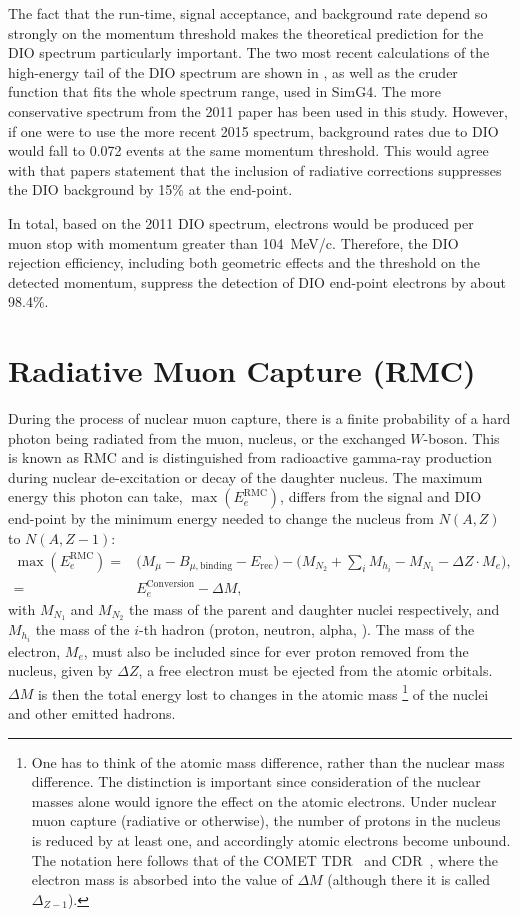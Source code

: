 \FigDIOEndPointComparison
The fact that the run-time, signal acceptance, and background rate depend so strongly on the momentum threshold makes the theoretical prediction for the \ac{DIO} spectrum particularly important.
The two most recent calculations of the high-energy tail of the DIO spectrum are shown in , as well as the cruder function that fits the whole spectrum range, used in SimG4.
The more conservative spectrum from the 2011 paper has been used in this study.
However, if one were to use the more recent 2015 spectrum, background rates due to DIO would fall to 0.072 events at the same momentum threshold.
This would agree with that papers statement that the inclusion of radiative corrections suppresses the DIO background by 15\% at the end-point.

In total, based on the 2011 DIO spectrum,  electrons would be produced per muon stop with momentum greater than 104~MeV/c.
Therefore, the DIO rejection efficiency, including both geometric effects and the threshold on the detected momentum, suppress the detection of DIO end-point electrons by about 98.4\%.

\section{Radiative Muon Capture (\acs{RMC})}
\TabRMCEndPoints%
During the process of nuclear muon capture, there is a finite probability of a hard photon being radiated from the muon, nucleus, or the exchanged $W$-boson.
This is known as \acf{RMC} and is distinguished from radioactive gamma-ray production during nuclear de-excitation or decay of the daughter nucleus.
The maximum energy this photon can take, $\max(E_e^\textrm{RMC})$, differs from the \mueconv signal and \ac{DIO} end-point by the minimum energy needed to change the nucleus from $N(A,Z)$ to $N(A,Z-1)$:
\begin{align}
\max(E_e^\textrm{RMC})=&\big(M_\mu - B_{\mu,\textrm{binding}} - E_\textrm{rec}\big)-\big(M_{N_2}+\sum_iM_{h_i}-M_{N_1}-\Delta{}Z\cdot{}M_e\big),\\
                      =&E^\textrm{Conversion}_e  - \Delta{}M,
\end{align}
with $M_{N_1}$ and $M_{N_2}$ the mass of the parent and daughter nuclei respectively, and $M_{h_i}$ the mass of the $i$-th hadron (proton, neutron, alpha, \etc).
The mass of the electron, $M_e$, must also be included since for ever proton removed from the nucleus, given by $\Delta{}Z$, a free electron must be ejected from the atomic orbitals.
$\Delta{}M$ is then the total energy lost to changes in the atomic mass%
\footnote{
One has to think of the atomic mass difference, rather than the nuclear mass difference.
The distinction is important since consideration of the nuclear masses alone would ignore the effect on the atomic electrons.
Under nuclear muon capture (radiative or otherwise), the number of protons in the nucleus is reduced by at least one, and accordingly atomic electrons become unbound.
The notation here follows that of the COMET TDR~\cite{TDR2016} and CDR~\cite{CDRphase2}, where the electron mass is absorbed into the value of $\Delta{}M$ (although there it is called $\Delta_{Z-1}$).
}
of the nuclei and other emitted hadrons.

